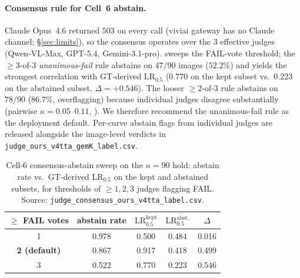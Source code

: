 \documentclass{article}
\begin{document}
\paragraph{Consensus rule for Cell~6 abstain.}
Claude Opus~4.6 returned $503$ on every call (viviai gateway has no
Claude channel; \S\ref{sec:limits}), so the consensus operates over
the $3$ effective judges (Qwen-VL-Max, GPT-5.4, Gemini-3.1-pro).
 sweeps the FAIL-vote threshold; the
$\geq 3$-of-$3$ \emph{unanimous-fail} rule abstains on $47/90$
images ($52.2\%$) and yields the strongest correlation with
GT-derived $\mathrm{LR}_{0.5}$ ($0.770$ on the kept subset vs.\
$0.223$ on the abstained subset, $\Delta{=}{+}0.546$). The looser
$\geq 2$-of-$3$ rule abstains on $78/90$ ($86.7\%$, overflagging)
because individual judges disagree substantially (pairwise
$\kappa{=}0.05$--$0.11$, ). We therefore
recommend the unanimous-fail rule as the deployment default.
Per-curve abstain flags from individual judges are released
alongside the image-level verdicts in
\texttt{judge\_ours\_v4tta\_gemK\_label.csv}.

\begin{table}[h]
\centering
\caption{Cell-6 consensus-abstain sweep on the $n{=}90$ hold:
abstain rate vs.\ GT-derived $\mathrm{LR}_{0.5}$ on the kept and
abstained subsets, for thresholds of $\geq 1, 2, 3$ judges flagging
FAIL. Source: \texttt{judge\_consensus\_ours\_v4tta\_label.csv}.}
\label{tab:judge-consensus}
\small
\begin{tabular}{ccccc}
\toprule
$\geq$ FAIL votes & abstain rate & $\mathrm{LR}_{0.5}^{\mathrm{kept}}$ &
                   $\mathrm{LR}_{0.5}^{\mathrm{abst.}}$ & $\Delta$ \\
\midrule
1 & 0.978 & 0.500 & 0.484 &  0.016 \\
\textbf{2 (default)} & 0.867 & 0.917 & 0.418 &  0.499 \\
3 & 0.522 & 0.770 & 0.223 &  0.546 \\
\bottomrule
\end{tabular}
\end{table}

\newpage

\end{document}
